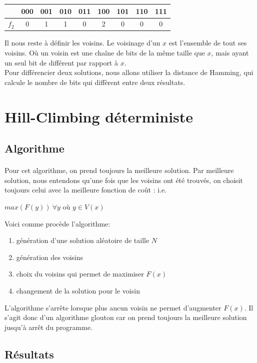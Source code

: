 \documentclass[a4paper, 11pt]{article}
\begin{document}
\begin{center}
\begin{tabular}{c | c |c | c|c|c|c|c|c}
 \  & 000 & 001 & 010 & 011 & 100 & 101 & 110 & 111\\
 \hline
 $f_2$ & 0 & 1 & 1 & 0 & 2 & 0 & 0 & 0
\end{tabular}
\end{center}

Il nous reste à définir les voisins. Le voisinage d'un $x$ est l'ensemble de tout ses voisins.
Où un voisin est une chaîne de bits de la même taille que $x$, mais ayant un seul bit de différent par rapport à $x$.
\\
Pour différencier deux solutions, nous allons utiliser la distance de Hamming, qui calcule le nombre de bits qui diffèrent entre deux
résultats. 

\section{Hill-Climbing déterministe}
\subsection{Algorithme}
\paragraph{}
Pour cet algorithme, on prend toujours la meilleure solution. 
Par meilleure solution, nous entendons qu'une fois que les voisins ont été trouvés, on choisit toujours celui avec la meilleure fonction 
de coût : i.e.
\begin{center}
 $max(F(y))\  \forall y$ où $y \in V(x)$ 
\end{center}
Voici comme procède l'algorithme:
\begin{enumerate}
 \item génération d'une solution aléatoire de taille $N$
 \item génération des voisins
 \item choix du voisins qui permet de maximiser $F(x)$
 \item changement de la solution pour le voisin

\end{enumerate}

L'algorithme s'arrête lorsque plus aucun voisin ne permet d'augmenter $F(x)$. Il s'agit donc d'un algorithme glouton car on prend toujours
la meilleure solution jusqu'à arrêt du programme.

\subsection{Résultats}
\end{document}
